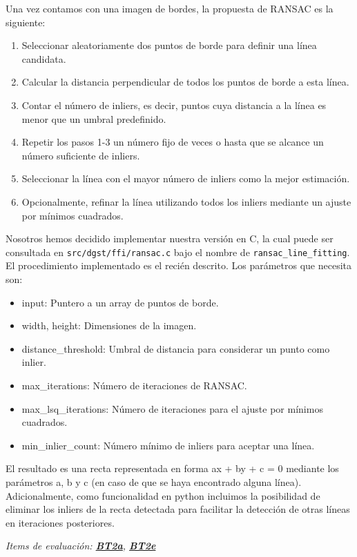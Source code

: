 \documentclass[11pt,a4paper]{article}
\begin{document}
Una vez contamos con una imagen de bordes, la propuesta de RANSAC es la siguiente:

\begin{enumerate}
    \item Seleccionar aleatoriamente dos puntos de borde para definir una línea candidata.
    \item Calcular la distancia perpendicular de todos los puntos de borde a esta línea.
    \item Contar el número de inliers, es decir, puntos cuya distancia a la línea es menor que un umbral predefinido.
    \item Repetir los pasos 1-3 un número fijo de veces o hasta que se alcance un número suficiente de inliers.
    \item Seleccionar la línea con el mayor número de inliers como la mejor estimación.
    \item Opcionalmente, refinar la línea utilizando todos los inliers mediante un ajuste por mínimos cuadrados.
\end{enumerate}

Nosotros hemos decidido implementar nuestra versión en C, la cual puede ser consultada en \texttt{src/dgst/ffi/ransac.c} bajo el 
nombre de \texttt{ransac\_line\_fitting}. El procedimiento implementado es el recién descrito. Los parámetros que necesita son:
\begin{itemize}
    \item input: Puntero a un array de puntos de borde.
    \item width, height: Dimensiones de la imagen.
    \item distance\_threshold: Umbral de distancia para considerar un punto como inlier.
    \item max\_iterations: Número de iteraciones de RANSAC.
    \item max\_lsq\_iterations: Número de iteraciones para el ajuste por mínimos cuadrados.
    \item min\_inlier\_count: Número mínimo de inliers para aceptar una línea.
\end{itemize}

El resultado es una recta representada en forma ax + by + c = 0 mediante los parámetros a, b y c (en caso de que se haya encontrado alguna línea).
Adicionalmente, como funcionalidad en python incluimos la posibilidad de eliminar los inliers de la recta detectada para facilitar la detección de 
otras líneas en iteraciones posteriores.

\textit{Items de evaluación: \underline{\textbf{BT2a}}, \underline{\textbf{BT2e}}}
\end{document}
